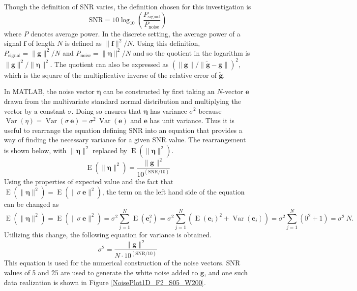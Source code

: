 \documentclass[12pt]{article}
\newcommand{\gVec}{\mathbf{g}}	%
\newcommand{\gnoiseVec}{\widetilde{\mathbf{g}}}	%
\newcommand{\noise}{\eta}	%
\newcommand{\noiseSD}{\sigma}	%
\newcommand{\noiseVec}{\bm{\noise}}	%
\newcommand{\Var}{\operatorname{Var}}	%
\newcommand{\E}{\operatorname{E}}	%
\begin{document}
Though the definition of SNR varies, the definition chosen for this investigation is
\begin{equation}
\label{eq:SNR}
\text{SNR} = 10\log_{10}\left(\frac{P_{\text{signal}}}{P_{\text{noise}}}\right)
\end{equation}
where $P$ denotes average power. In the discrete setting, the average power of a signal $\mathbf{f}$ of length $N$ is defined as $\|\mathbf{f}\|^2/N$. Using this definition, $P_{\text{signal}} = \|\gVec\|^2/N$ and $P_{\text{noise}} = \|\noiseVec\|^2/N$ and so the quotient in the logarithm is $\|\gVec\|^2/\|\noiseVec\|^2$. The quotient can also be expressed as $(\|\gVec\|/\|\gnoiseVec - \gVec\|)^2$, which is the square of the multiplicative inverse of the relative error of $\gnoiseVec$. \par
In MATLAB, the noise vector $\noiseVec$ can be constructed by first taking an $N$-vector $\mathbf{e}$ drawn from the multivariate standard normal distribution and multiplying the vector by a constant $\noiseSD$. Doing so ensures that $\noiseVec$ has variance $\noiseSD^2$ because $\Var(\noise) = \Var(\noiseSD\:\mathbf{e}) = \noiseSD^2\:\Var(\mathbf{e})$ and $\mathbf{e}$ has unit variance. Thus it is useful to rearrange the equation defining SNR into an equation that provides a way of finding the necessary variance for a given SNR value. The rearrangement is shown below, with $\|\noiseVec\|^2$ replaced by $\E(\|\noiseVec\|^2)$.
\[\E(\|\noiseVec\|^2) = \frac{\|\gVec\|^2}{10^{(\text{SNR}/10)}}\]
Using the properties of expected value and the fact that $\E(\|\noiseVec\|^2) = \E(\|\noiseSD\:\mathbf{e}\|^2)$, the term on the left hand side of the equation can be changed as
\[\E(\|\noiseVec\|^2) = \E(\|\noiseSD\:\mathbf{e}\|^2) = \noiseSD^2 \sum_{j=1}^N \E(\mathbf{e}_i^2) = \noiseSD^2 \sum_{j=1}^N \left(\E(\mathbf{e}_i)^2 + \Var(\mathbf{e}_i)\right) = \noiseSD^2 \sum_{j=1}^N \left(0^2 + 1\right) = \noiseSD^2\:N.\]
Utilizing this change, the following equation for variance is obtained.
\begin{equation}
\label{eq:Var}
\noiseSD^2 = \frac{\|\gVec\|^2}{N \cdot 10^{(\text{SNR}/10)}}
\end{equation}
This equation is used for the numerical construction of the noise vectors. SNR values of 5 and 25 are used to generate the white noise added to $\gVec$, and one such data realization is shown in Figure \ref{NoisePlot1D_F2_S05_W200}. \par
\end{document}
